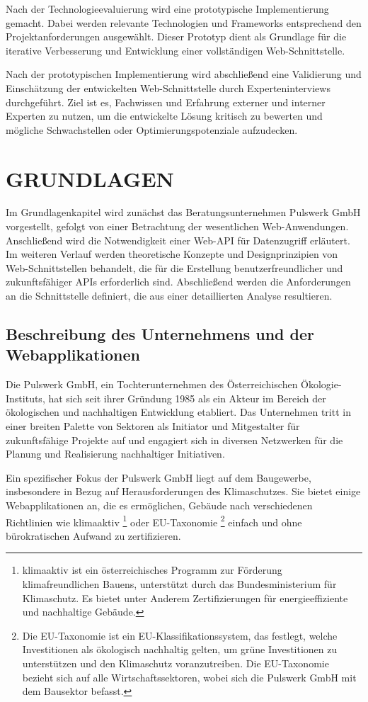 \documentclass[draft,final]{vutinfth} %
\begin{document}
Nach der Technologieevaluierung wird eine prototypische Implementierung gemacht. 
Dabei werden relevante Technologien und Frameworks entsprechend den Projektanforderungen ausgewählt. 
Dieser Prototyp dient als Grundlage für die iterative Verbesserung und Entwicklung einer vollständigen Web-Schnittstelle.

Nach der prototypischen Implementierung wird abschließend eine Validierung und Einschätzung der entwickelten Web-Schnittstelle durch Experteninterviews durchgeführt. 
Ziel ist es, Fachwissen und Erfahrung externer und interner Experten zu nutzen, um die entwickelte Lösung kritisch zu bewerten und mögliche Schwachstellen oder Optimierungspotenziale aufzudecken.










\chapter{GRUNDLAGEN}

Im Grundlagenkapitel wird zunächst das Beratungsunternehmen Pulswerk GmbH vorgestellt, gefolgt von einer Betrachtung der wesentlichen Web-Anwendungen. Anschließend wird die Notwendigkeit einer Web-API für Datenzugriff erläutert. 
Im weiteren Verlauf werden theoretische Konzepte und Designprinzipien von Web-Schnittstellen behandelt, die für die Erstellung benutzerfreundlicher und zukunftsfähiger APIs erforderlich sind.
Abschließend werden die Anforderungen an die Schnittstelle definiert, die aus einer detaillierten Analyse resultieren. 


\section{Beschreibung des Unternehmens und der Webapplikationen}

Die Pulswerk GmbH, ein Tochterunternehmen des Österreichischen Ökologie-Instituts, hat sich seit ihrer Gründung 1985 als ein Akteur im Bereich der ökologischen und nachhaltigen Entwicklung etabliert. 
Das Unternehmen tritt in einer breiten Palette von Sektoren als Initiator und Mitgestalter für zukunftsfähige Projekte auf und engagiert sich in diversen Netzwerken für die Planung und Realisierung nachhaltiger Initiativen.

Ein spezifischer Fokus der Pulswerk GmbH liegt auf dem Baugewerbe, insbesondere in Bezug auf Herausforderungen des Klimaschutzes. 
Sie bietet einige Webapplikationen an, die es ermöglichen, Gebäude nach verschiedenen Richtlinien wie klimaaktiv
\footnote{
	klimaaktiv ist ein österreichisches Programm zur Förderung klimafreundlichen Bauens, unterstützt durch das Bundesministerium für Klimaschutz. 
	Es bietet unter Anderem Zertifizierungen für energieeffiziente und nachhaltige Gebäude.
} 
oder EU-Taxonomie
\footnote{
	Die EU-Taxonomie ist ein EU-Klassifikationssystem, das festlegt, welche Investitionen als ökologisch nachhaltig
	gelten, um grüne Investitionen zu unterstützen und den Klimaschutz voranzutreiben.
	Die EU-Taxonomie bezieht sich auf alle Wirtschaftssektoren, wobei sich die Pulswerk GmbH mit dem Bausektor befasst. 
} 
einfach und ohne bürokratischen Aufwand zu zertifizieren. 
\end{document}
